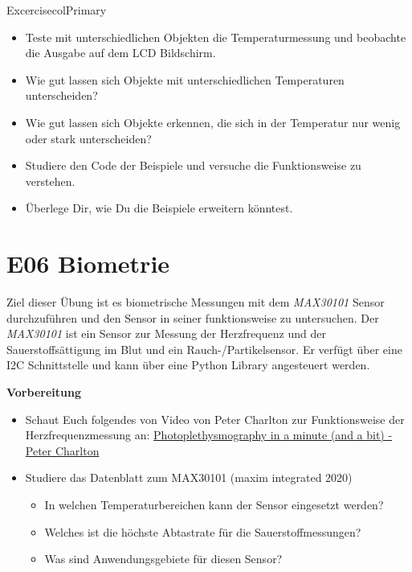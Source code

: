 \documentclass[
  11pt,
  a4paper,
  oneside, openany  ,captions=tableheading
]{scrbook}
\providecommand{\tightlist}{%
  \setlength{\itemsep}{0pt}\setlength{\parskip}{0pt}}
\theoremstyle{remark}
\begin{document}
\begin{boxtitle}{Excercise}{colPrimary}

\begin{itemize}
\tightlist
\item
  Teste mit unterschiedlichen Objekten die Temperaturmessung und
  beobachte die Ausgabe auf dem LCD Bildschirm.
\item
  Wie gut lassen sich Objekte mit unterschiedlichen Temperaturen
  unterscheiden?
\item
  Wie gut lassen sich Objekte erkennen, die sich in der Temperatur nur
  wenig oder stark unterscheiden?
\item
  Studiere den Code der Beispiele und versuche die Funktionsweise zu
  verstehen.
\item
  Überlege Dir, wie Du die Beispiele erweitern könntest.
\end{itemize}

\end{boxtitle}

\chapter*{E06 Biometrie}\label{e06-biometrie}


Ziel dieser Übung ist es biometrische Messungen mit dem \emph{MAX30101}
Sensor durchzuführen und den Sensor in seiner funktionsweise zu
untersuchen. Der \emph{MAX30101} ist ein Sensor zur Messung der
Herzfrequenz und der Sauerstoffsättigung im Blut und ein
Rauch-/Partikelsensor. Er verfügt über eine I2C Schnittstelle und kann
über eine Python Library angesteuert werden.

\textbf{Vorbereitung}

\begin{itemize}
\tightlist
\item
  Schaut Euch folgendes von Video von Peter Charlton zur Funktionsweise
  der Herzfrequenzmessung an:
  \href{https://www.youtube.com/embed/HnXDvN4WNX8?si=EeIAlSWW2Z1SJBof}{Photoplethysmography
  in a minute (and a bit) - Peter Charlton}
\item
  Studiere das Datenblatt zum MAX30101 (maxim integrated 2020)

  \begin{itemize}
  \tightlist
  \item
    In welchen Temperaturbereichen kann der Sensor eingesetzt werden?
  \item
    Welches ist die höchste Abtastrate für die Sauerstoffmessungen?
  \item
    Was sind Anwendungsgebiete für diesen Sensor?
  \end{itemize}
\end{itemize}
\end{document}
